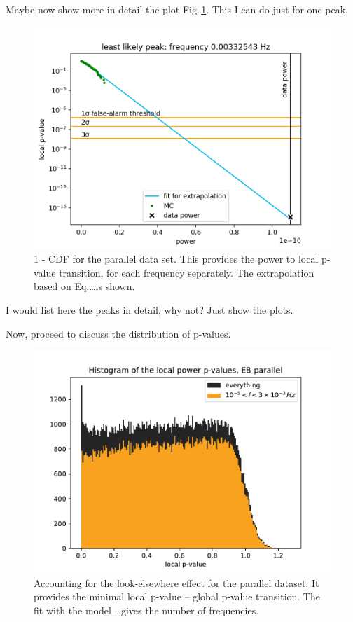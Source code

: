 Maybe now show more in detail the plot Fig.\,\ref{fig:P_best_signal_candidate}. This I can do just for one peak.
\begin{figure}
  \centering
  \includegraphics[width=\linewidth]{gfx/axions/P_best_signal_candidate.png}
  \caption{1 - CDF for the parallel data set. This provides the power to local p-value transition, for each frequency separately. The extrapolation based on Eq.\ldots is shown.}
  \label{fig:P_best_signal_candidate}
\end{figure}

I would list here the peaks in detail, why not? Just show the plots.






Now, proceed to discuss the distribution of p-values.
\begin{figure}
  \centering
  \includegraphics[width=\linewidth]{gfx/axions/P_p-values.pdf}
  \caption{Accounting for the look-elsewhere effect for the parallel dataset. It provides the minimal local p-value -- global p-value transition. The fit with the model \dots gives the number of frequencies.}
  \label{fig:P_p-values}
\end{figure}


